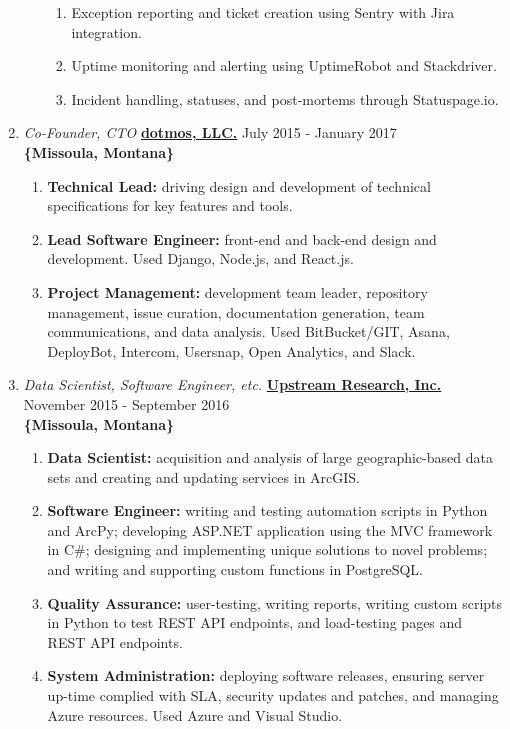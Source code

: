 \documentclass[oneside]{article}%
\begin{document}
\begin{enumerate}[]
\begin{enumerate}[]
\begin{enumerate}[-]
					\item Exception reporting and ticket creation using Sentry with Jira integration.
					\item Uptime monitoring and alerting using UptimeRobot and Stackdriver.
					\item Incident handling, statuses, and post-mortems through Statuspage.io.
				\end{enumerate}
		\end{enumerate}
	\item \textit{Co-Founder, CTO} \textbf{\href{https://dotmos.com}{dotmos, LLC.}} \hfill July 2015 - January 2017\\
		\textbf{\{Missoula, Montana\}}
		\begin{enumerate}[*]
			\item \textbf{Technical Lead:} driving design and development of technical specifications for key features and tools.
			\item \textbf{Lead Software Engineer:} front-end and back-end design and development. Used Django, Node.js, and React.js.
			\item \textbf{Project Management:} development team leader, repository management, issue curation, documentation generation, team communications, and data analysis. Used BitBucket/GIT, Asana, DeployBot, Intercom, Usersnap, Open Analytics, and Slack.
		\end{enumerate}
\newpage
	\item \textit{Data Scientist, Software Engineer, etc.} \textbf{\href{https://upstreamresearch.com}{Upstream Research, Inc.}} \hfill November 2015 - September 2016\\
		\textbf{\{Missoula, Montana\}}
		\begin{enumerate}[*]
			\item \textbf{Data Scientist:} acquisition and analysis of large geographic-based data sets and creating and updating services in ArcGIS.
			\item \textbf{Software Engineer:} writing and testing automation scripts in Python and ArcPy; developing ASP.NET application using the MVC framework in C\#; designing and implementing unique solutions to novel problems; and writing and supporting custom functions in PostgreSQL.
			\item \textbf{Quality Assurance:} user-testing, writing reports, writing custom scripts in Python to test REST API endpoints, and load-testing pages and REST API endpoints.
			\item \textbf{System Administration:} deploying software releases, ensuring server up-time complied with SLA, security updates and patches, and managing Azure resources. Used Azure and Visual Studio.

\end{enumerate}
\end{enumerate}
\end{document}
